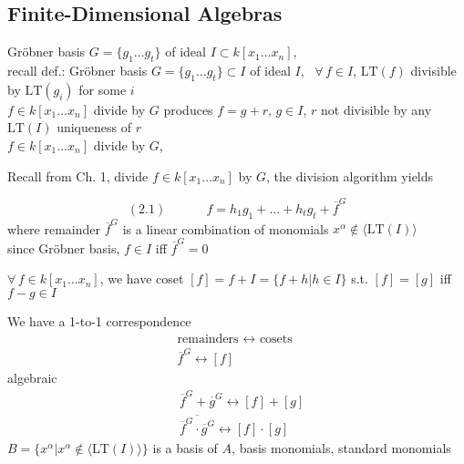 \documentclass[10pt]{amsart}
\begin{document}
\begin{multicols*}{2}
\subsection{}

\subsection{Finite-Dimensional Algebras}

Gr\"obner basis $G = \lbrace g_1 \dots g_t \rbrace$ of ideal $I\subset k[x_1\dots x_n]$, \\
recall def.: Gr\"obner basis $G = \lbrace g_1 \dots g_t\rbrace \subset I$ of ideal $I$, \, $\forall \, f \in I$, $\text{LT}(f)$ divisible by $\text{LT}(g_i)$ for some $i$ \\
\phantom{\quad \, } $f \in k[x_1\dots x_n]$ divide by $G$ produces $f=g+r$, $g\in I$, $r$ not divisible by any $\text{LT}(I)$ uniqueness of $r$ \\
$f\in k[x_1 \dots x_n]$ divide by $G$, 

Recall from Ch. 1, divide $f\in k[x_1 \dots x_n]$ by $G$, the division algorithm yields

\begin{equation}
  (2.1)  \quad \quad \quad \, f = h_1 g_1 + \dots + h_t g_t + \overline{f}^G
\end{equation}
where remainder $\overline{f}^G$ is a linear combination of monomials $x^{\alpha} \notin \langle \text{LT}(I) \rangle $ \\
\phantom{\quad } since Gr\"obner basis, $f\in I$ iff $\overline{f}^G=0$

$\forall \, f \in k[x_1\dots x_n]$, we have coset $[f] = f+I = \lbrace f +h|h\in I\rbrace$ s.t. $[f]=[g]$ iff $f- g \in I$

We have a 1-to-1 correspondence 
\[
\begin{gathered}
\text{remainders } \leftrightarrow \text{ cosets } \\
\overline{f}^G \leftrightarrow [f]
\end{gathered}
\]
algebraic
\[
\begin{aligned}
  & \overline{f}^G + \overline{g}^G \leftrightarrow [f] + [g] \\ 
  & \overline{ \overline{f}^G \cdot \overline{g}^G } \leftrightarrow [f]\cdot [g]
\end{aligned}
\]
$B = \lbrace x^{\alpha} | x^{\alpha} \notin \langle \text{LT}(I) \rangle \rbrace$ is a basis of $A$, basis monomials, standard monomials


\end{multicols*}
\end{document}
